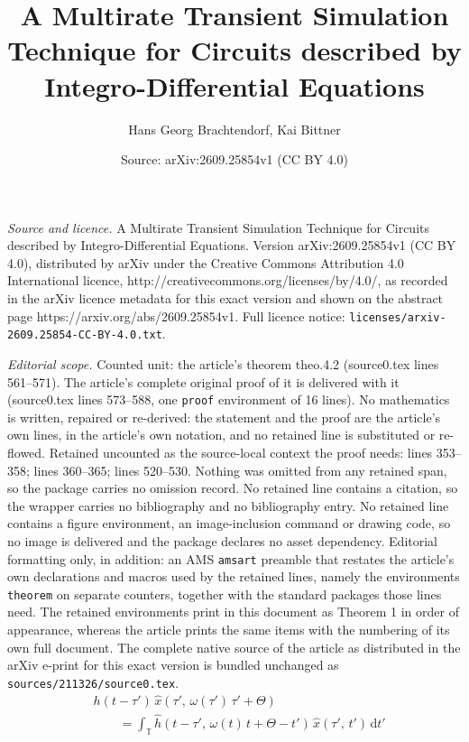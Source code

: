 \documentclass[10pt,a4paper]{amsart}
\title{A Multirate Transient Simulation Technique for Circuits described by Integro-Differential Equations}
\author{Hans Georg Brachtendorf, Kai Bittner}
\date{Source: arXiv:2609.25854v1 (CC BY 4.0)}
\newcommand{\TT}{\ensuremath{\mathbb{T}}}
\newcommand{\drm}{\ensuremath{\mathrm{d}}}
\newcommand{\no}{\nonumber}
\begin{document}
\maketitle

\noindent\emph{Source and licence.} A Multirate Transient Simulation Technique for Circuits described by Integro-Differential Equations. Version arXiv:2609.25854v1 (CC BY 4.0), distributed by arXiv under the Creative Commons Attribution 4.0 International licence, http://creativecommons.org/licenses/by/4.0/, as recorded in the arXiv licence metadata for this exact version and shown on the abstract page https://arxiv.org/abs/2609.25854v1. Full licence notice: \texttt{licenses/arxiv-2609.25854-CC-BY-4.0.txt}.\par\smallskip

\noindent\textit{Editorial scope.} Counted unit: the article's theorem theo.4.2 (source0.tex lines 561--571). The article's complete original proof of it is delivered with it (source0.tex lines 573--588, one \texttt{proof} environment of 16 lines). No mathematics is written, repaired or re-derived: the statement and the proof are the article's own lines, in the article's own notation, and no retained line is substituted or re-flowed.  Retained uncounted as the source-local context the proof needs: lines 353--358; lines 360--365; lines 520--530.  Nothing was omitted from any retained span, so the package carries no omission record.  No retained line contains a citation, so the wrapper carries no bibliography and no bibliography entry.  No retained line contains a figure environment, an image-inclusion command or drawing code, so no image is delivered and the package declares no asset dependency.  Editorial formatting only, in addition: an AMS \texttt{amsart} preamble that restates the article's own declarations and macros used by the retained lines, namely the environments \texttt{theorem} on separate counters, together with the standard packages those lines need.  The retained environments print in this document as Theorem 1 in order of appearance, whereas the article prints the same items with the numbering of its own full document.  The complete native source of the article as distributed in the arXiv e-print for this exact version is bundled unchanged as \texttt{sources/211326/source0.tex}.
	\begin{align}
	 & h(t-\tau')\, \hat{x}(\tau',\,\omega(\tau')\,\tau'+\Theta) \no\\
	 &\qquad = \int_\TT
	      \hat{h}(t-\tau',\,\omega(t)\,t+\Theta-t')\,\hat{x}(\tau',\,t')\,\drm t'
	      \label{eq.theo.1}
	\end{align}
\end{document}
